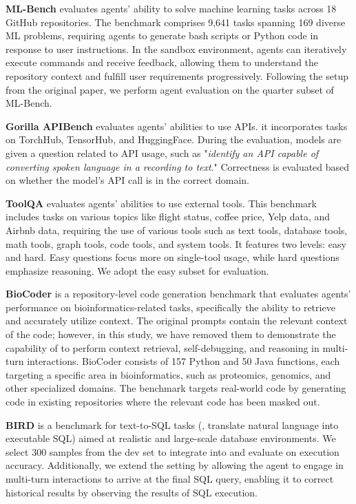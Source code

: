 \textbf{ML-Bench} \citep{liu2024mlbench} 
evaluates agents' ability to solve machine learning tasks across 18 GitHub repositories.
The benchmark comprises 9,641 tasks spanning 169 diverse ML problems, requiring agents to generate bash scripts or Python code in response to user instructions.
In the sandbox environment, agents can iteratively execute commands and receive feedback, allowing them to understand the repository context and fulfill user requirements progressively.
Following the setup from the original paper, we perform agent evaluation on the quarter subset of ML-Bench.

\textbf{Gorilla APIBench} \citep{patil2023gorilla} evaluates agents' abilities to use APIs. it incorporates tasks on TorchHub, TensorHub, and HuggingFace. During the evaluation, models are given a question related to API usage, such as "\textit{identify an API capable of converting spoken language in a recording to text}." Correctness is evaluated based on whether the model’s API call is in the correct domain.

\textbf{ToolQA} \citep{zhuang2024toolqa} evaluates agents' abilities to use external tools. This benchmark includes tasks on various topics like flight status, coffee price, Yelp data, and Airbnb data, requiring the use of various tools such as text tools, database tools, math tools, graph tools, code tools, and system tools.
It features two levels: easy and hard. Easy questions focus more on single-tool usage, while hard questions emphasize reasoning. We adopt the easy subset for evaluation.

\textbf{BioCoder} \citep{tang2023biocoder} is a repository-level code generation benchmark that evaluates agents' performance on bioinformatics-related tasks, specifically the ability to retrieve and accurately utilize context. The original prompts contain the relevant context of the code; however, in this study, we have removed them to demonstrate the capability of \projname to perform context retrieval, self-debugging, and reasoning in multi-turn interactions. BioCoder consists of 157 Python and 50 Java functions, each targeting a specific area in bioinformatics, such as proteomics, genomics, and other specialized domains. The benchmark targets real-world code by generating code in existing repositories where the relevant code has been masked out.


\textbf{BIRD} \citep{bird} is a benchmark for text-to-SQL tasks (\ie, translate natural language into executable SQL) aimed at realistic and large-scale database environments.
We select 300 samples from the dev set to integrate into \projname and evaluate on execution accuracy. 
Additionally, we extend the setting by allowing the agent to engage in multi-turn interactions to arrive at the final SQL query, enabling it to correct historical results by observing the results of SQL execution.

